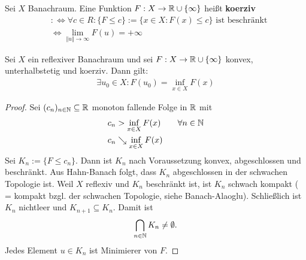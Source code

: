 \begin{erinnerung}
Sei $X$ Banachraum. Eine Funktion $F:X\to\mathbb{R}\cup\lbrace\infty\rbrace$ heißt \textbf{koerziv}
\begin{align*}
&:\Longleftrightarrow\forall c\in R:\big\lbrace F\leq c\big\rbrace:=\big\lbrace x\in X:F(x)\leq c\big\rbrace\text{ ist beschränkt}\\
&\Longleftrightarrow\lim\limits_{\Vert u\Vert\to\infty} F(u)=+\infty
\end{align*}
\end{erinnerung}

\begin{theorem}\enter
Sei $X$ ein reflexiver Banachraum und sei $F:X\to\mathbb{R}\cup\lbrace\infty\rbrace$ konvex, unterhalbstetig und koerziv. Dann gilt:
\begin{align*}
\exists u_0\in X:F(u_0)=\inf\limits_{x\in X}F(x)
\end{align*}
\end{theorem}
\begin{proof}
Sei $(c_n)_{n\in\mathbb{N}}\subseteq\mathbb{R}$ monoton fallende Folge in $\mathbb{R}$ mit
\begin{align*}
c_n &> \inf\limits_{x\in X} F(x) \qquad \forall n\in\mathbb{N}\\
c_n &\searrow \inf\limits_{x\in X}F(x)
\end{align*}
Sei $K_n:=\big\lbrace F\leq c_n\big\rbrace$. Dann ist $K_n$ nach Voraussetzung konvex, abgeschlossen und beschränkt. Aus Hahn-Banach folgt, dass $K_n$ abgeschlossen in der schwachen Topologie ist. Weil $X$ reflexiv und $K_n$ beschränkt ist, ist $K_n$ schwach kompakt ( = kompakt bzgl. der schwachen Topologie, siehe Banach-Alaoglu). Schließlich ist $K_n$ nichtleer und $K_{n+1}\subseteq K_n$. Damit ist 
\begin{align*}
\bigcap\limits_{n\in\mathbb{N}}K_n\neq\emptyset.
\end{align*}
Jedes Element $u\in K_n$ ist Minimierer von $F$.
\end{proof}

